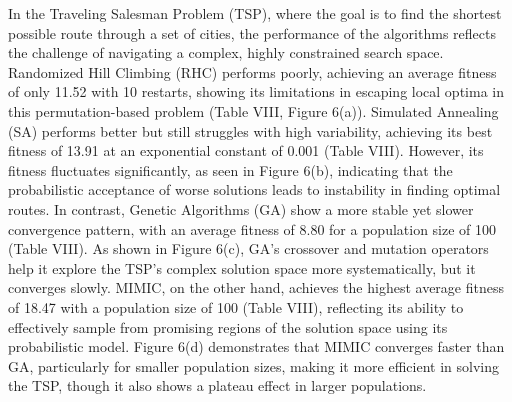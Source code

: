 In the Traveling Salesman Problem (TSP), where the goal is to find the shortest possible route through a set of cities, the performance of the algorithms reflects the challenge of navigating a complex, highly constrained search space. Randomized Hill Climbing (RHC) performs poorly, achieving an average fitness of only 11.52 with 10 restarts, showing its limitations in escaping local optima in this permutation-based problem (Table VIII, Figure 6(a)). Simulated Annealing (SA) performs better but still struggles with high variability, achieving its best fitness of 13.91 at an exponential constant of 0.001 (Table VIII). However, its fitness fluctuates significantly, as seen in Figure 6(b), indicating that the probabilistic acceptance of worse solutions leads to instability in finding optimal routes. In contrast, Genetic Algorithms (GA) show a more stable yet slower convergence pattern, with an average fitness of 8.80 for a population size of 100 (Table VIII). As shown in Figure 6(c), GA's crossover and mutation operators help it explore the TSP's complex solution space more systematically, but it converges slowly. MIMIC, on the other hand, achieves the highest average fitness of 18.47 with a population size of 100 (Table VIII), reflecting its ability to effectively sample from promising regions of the solution space using its probabilistic model. Figure 6(d) demonstrates that MIMIC converges faster than GA, particularly for smaller population sizes, making it more efficient in solving the TSP, though it also shows a plateau effect in larger populations.

